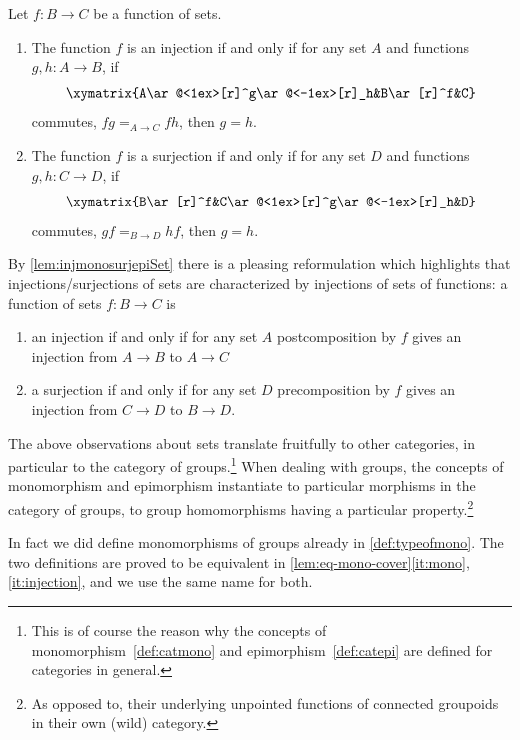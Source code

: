 \begin{lemma}
  \label{lem:injmonosurjepiSet}Let $f:B\to C$ be a function of sets.
  \begin{enumerate}
\item\label{it:injmono} The function $f$ is an injection 
if and only if for any set $A$ and functions $g,h:A\to B$, if
$$\xymatrix{A\ar@<1ex>[r]^g\ar@<-1ex>[r]_h&B\ar[r]^f&C}$$
commutes, \ie $fg=_{A\to C}fh$, then $g=h$.
\item\label{it:surjepi} The function $f$ is a surjection if and only if for any set $D$ and functions $g,h:C\to D$, if
$$\xymatrix{B\ar[r]^f&C\ar@<1ex>[r]^g\ar@<-1ex>[r]_h&D}$$
commutes, \ie $gf=_{B\to D}hf$, then $g=h$.
  \end{enumerate}
\end{lemma}

By \cref{lem:injmonosurjepiSet} there is a pleasing reformulation which highlights that injections/surjections of sets are characterized by injections of sets of functions: a function of sets $f:B\to C$ is
\begin{enumerate}
\item  an injection if and only if for any set $A$ postcomposition by $f$ gives an injection from $A\to B$ to $A\to C$
\item a surjection if and only if for any set $D$ precomposition by $f$ gives an injection from $C\to D$ to $B\to D$.
\end{enumerate}

The above observations about sets translate fruitfully to other categories,
in particular to the category of groups.\footnote{%
This is of course the reason
why the concepts of monomorphism~\cref{def:catmono} and epimorphism~\cref{def:catepi} are defined for categories in general.}
When dealing with groups, the concepts of monomorphism and epimorphism
instantiate to particular morphisms in the category of groups,
\ie to group homomorphisms having a particular property.\footnote{%
As opposed to, \eg their underlying unpointed functions of connected 
groupoids in their own (wild) category.} 

In fact we did define monomorphisms of groups already in
\cref{def:typeofmono}.
The two definitions are proved to be equivalent in
\cref{lem:eq-mono-cover}\ref{it:mono},\ref{it:injection}, 
and we use the same name for both.

